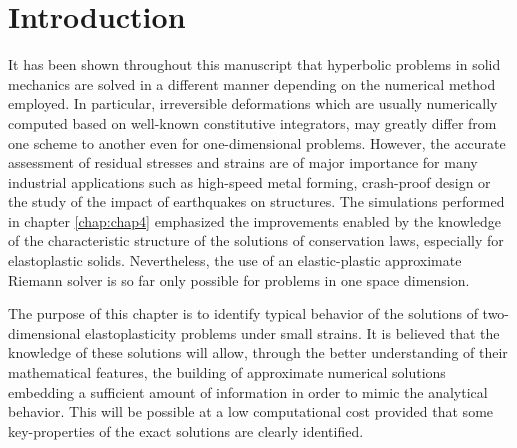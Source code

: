
\section*{Introduction}
It has been shown throughout this manuscript that hyperbolic problems in solid mechanics are solved in a different manner depending on the numerical method employed. 
In particular, irreversible deformations which are usually numerically computed based on well-known constitutive integrators, may greatly differ from one scheme to another even for one-dimensional problems.
However, the accurate assessment of residual stresses and strains are of major importance for many industrial applications such as high-speed metal forming, crash-proof design or the study of the impact of earthquakes on structures.
The simulations performed in chapter \ref{chap:chap4} emphasized the improvements enabled by the knowledge of the characteristic structure of the solutions of conservation laws, especially for elastoplastic solids.
Nevertheless, the use of an elastic-plastic approximate Riemann solver is so far only possible for problems in one space dimension.

The purpose of this chapter is to identify typical behavior of the solutions of two-dimensional elastoplasticity problems under small strains.
It is believed that the knowledge of these solutions will allow, through the better understanding of their mathematical features, the building of approximate numerical solutions embedding a sufficient amount of information in order to mimic the analytical behavior.
This will be possible at a low computational cost provided that some key-properties of the exact solutions are clearly identified. 

